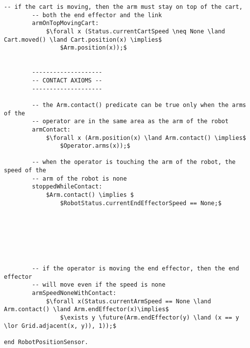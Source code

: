 \begin{lstlisting}[fontadjust, mathescape, frame=single]
        -- if the cart is moving, then the arm must stay on top of the cart,
        -- both the end effector and the link
        armOnTopMovingCart: 
            $\forall x (Status.currentCartSpeed \neq None \land Cart.moved() \land Cart.position(x) \implies$
                $Arm.position(x));$


        --------------------
        -- CONTACT AXIOMS --
        --------------------

        -- the Arm.contact() predicate can be true only when the arms of the 
        -- operator are in the same area as the arm of the robot
        armContact:
            $\forall x (Arm.position(x) \land Arm.contact() \implies$
                $Operator.arms(x));$

        -- when the operator is touching the arm of the robot, the speed of the
        -- arm of the robot is none
        stoppedWhileContact:
            $Arm.contact() \implies $
                $RobotStatus.currentEndEffectorSpeed == None;$






                
        -- if the operator is moving the end effector, then the end effector 
        -- will move even if the speed is none
        armSpeedNoneWithContact: 
            $\forall x(Status.currentArmSpeed == None \land Arm.contact() \land Arm.endEffector(x)\implies$
                $\exists y \future(Arm.endEffector(y) \land (x == y \lor Grid.adjacent(x, y)), 1));$
        
end RobotPositionSensor.
\end{lstlisting}